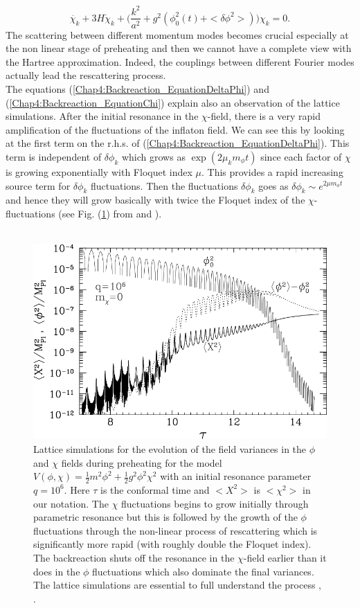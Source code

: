 \documentclass[11pt,a4paper,twoside]{book}
\begin{document}
\begin{equation}
\label{Chap4:Backreaction_deltaChiHartree}
\ddot{\chi_{k}} + 3H \dot{\chi}_{k} + \Bigg(\frac{k^{2}}{a^{2}} + g^{2}(\phi_{0}^{2}(t) + <\delta \phi^{2}>)\Bigg)\chi_{k}=0.
\end{equation}
The scattering between different momentum modes becomes crucial especially  at the non linear stage of preheating and then we cannot have a complete view with the Hartree approximation. Indeed, the couplings between different Fourier modes actually lead the rescattering process.\\
The equations (\ref{Chap4:Backreaction_EquationDeltaPhi}) and (\ref{Chap4:Backreaction_EquationChi}) explain also an observation of the lattice simulations. After the initial resonance in the $\chi$-field, there is a very rapid amplification of the fluctuations of the inflaton field. We can see this by looking at the first term on the r.h.s. of (\ref{Chap4:Backreaction_EquationDeltaPhi}). This term is independent of $\delta \phi_{k}$ which grows as $ \exp(2\mu_{k}m_{\phi}t) $ since each factor of $\chi$ is growing  exponentially with Floquet index $\mu$. This provides a rapid increasing source term for $\delta \phi_{k} $ fluctuations. Then the fluctuations $\delta \phi_{k}$ goes as $ \delta \phi_{k} \sim e^{2\mu m_{\phi}t} $ and hence they  will grow basically with twice the Floquet index of the $\chi$-fluctuations (see Fig. (\ref{fig:nonlineardynamics}) from \cite{Chap4:Reference2} and \cite{InflationDynamicsAndReheating:chap1}).  \\ 
\\
\begin{figure}
	\centering
	\includegraphics[width=0.6\linewidth, height=0.35\textheight]{Images/Chap4/NonLinearDynamics}
	\caption{Lattice simulations for the evolution of the field  variances in the $\phi$ and $\chi$ fields during preheating for the model $ V(\phi,\chi)=\frac{1}{2}m^{2}\phi^{2} + \frac{1}{2}g^{2}\phi^{2}\chi^{2} $ with an initial resonance parameter $ q=10^{6} $. Here $\tau$  is the conformal time and $ <X^{2}> $ is $ <\chi^{2}> $ in our notation. The $\chi$ fluctuations begins to grow initially through parametric resonance but this is followed by the growth of the $\phi$ fluctuations through the non-linear process of rescattering which is significantly more rapid (with roughly double the Floquet index). The backreaction shuts off the resonance in the $\chi$-field earlier than it does in the $\phi$ fluctuations which also dominate the final variances. The lattice simulations are essential to full understand the process \cite{Chap4:Reference2}, \cite{InflationDynamicsAndReheating:chap1}. }
	\label{fig:nonlineardynamics}
\end{figure}
\end{document}

